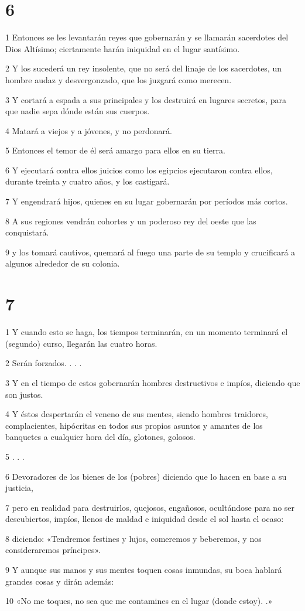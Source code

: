 \chapter{6}

\par 1 Entonces se les levantarán reyes que gobernarán y se llamarán sacerdotes del Dios Altísimo; ciertamente harán iniquidad en el lugar santísimo.
\par 2 Y los sucederá un rey insolente, que no será del linaje de los sacerdotes, un hombre audaz y desvergonzado, que los juzgará como merecen.
\par 3 Y cortará a espada a sus principales y los destruirá en lugares secretos, para que nadie sepa dónde están sus cuerpos.
\par 4 Matará a viejos y a jóvenes, y no perdonará.
\par 5 Entonces el temor de él será amargo para ellos en su tierra.
\par 6 Y ejecutará contra ellos juicios como los egipcios ejecutaron contra ellos, durante treinta y cuatro años, y los castigará.
\par 7 Y engendrará hijos, quienes en su lugar gobernarán por períodos más cortos.
\par 8 A sus regiones vendrán cohortes y un poderoso rey del oeste que las conquistará.
\par 9 y los tomará cautivos, quemará al fuego una parte de su templo y crucificará a algunos alrededor de su colonia.

\chapter{7}

\par 1 Y cuando esto se haga, los tiempos terminarán, en un momento terminará el (segundo) curso, llegarán las cuatro horas.
\par 2 Serán forzados. . . .
\par 3 Y en el tiempo de estos gobernarán hombres destructivos e impíos, diciendo que son justos.
\par 4 Y éstos despertarán el veneno de sus mentes, siendo hombres traidores, complacientes, hipócritas en todos sus propios asuntos y amantes de los banquetes a cualquier hora del día, glotones, golosos.
\par 5 . . .
\par 6 Devoradores de los bienes de los (pobres) diciendo que lo hacen en base a su justicia,
\par 7 pero en realidad para destruirlos, quejosos, engañosos, ocultándose para no ser descubiertos, impíos, llenos de maldad e iniquidad desde el sol hasta el ocaso:
\par 8 diciendo: «Tendremos festines y lujos, comeremos y beberemos, y nos consideraremos príncipes».
\par 9 Y aunque sus manos y sus mentes toquen cosas inmundas, su boca hablará grandes cosas y dirán además:
\par 10 «No me toques, no sea que me contamines en el lugar (donde estoy). .»

